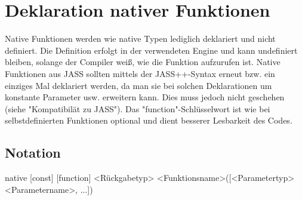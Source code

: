 \chapter{Deklaration nativer Funktionen}
Native Funktionen werden wie native Typen lediglich deklariert und nicht definiert. Die Definition erfolgt in der verwendeten Engine und kann
undefiniert bleiben, solange der Compiler weiß, wie die Funktion aufzurufen ist.
Native Funktionen aus JASS sollten mittels der JASS++-Syntax erneut bzw. ein einziges Mal deklariert werden, da man sie bei solchen Deklarationen
um konstante Parameter usw. erweitern kann.
Dies muss jedoch nicht geschehen (siehe "Kompatibilät zu JASS").
Das "function"-Schlüsselwort ist wie bei selbstdefinierten Funktionen optional und dient besserer Lesbarkeit des Codes.

\section{Notation}
native [const] [function] <Rückgabetyp> <Funktionsname>([<Parametertyp> <Parametername>, ...])